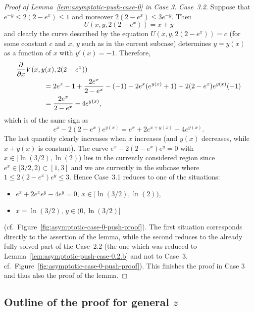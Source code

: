 \documentclass[a4paper]{amsart} %
\theoremstyle{definition}
\theoremstyle{remark}
\numberwithin{equation}{section}
\newcommand*{\XXXasymptoticDenominator}{V}
\newcommand*{\XXXasymptoticNominator}{U}
\begin{document}
\begin{proof}[Proof of Lemma~\ref{lem:asymptotic-push-case-0} in Case 3]
	\emph{Case~3.2}. Suppose that $e^{-y} \leq 2(2-e^x) \leq 1 $ and moreover $2(2-e^x) \leq 3e^{-y}$.
	Then
	\begin{equation*}
	\XXXasymptoticNominator(x,y,2(2-e^x)) = x + y
	\end{equation*}
	and clearly the curve described by the equation $\XXXasymptoticNominator(x,y,2(2-e^x)) = c$
	(for some constant $c$ and $x$, $y$ such as in the current subcase) determines $y=y(x)$ as a function of $x$ with $y'(x) = -1$.
	Therefore,
\begin{align*}
\MoveEqLeft[4]
\frac{\partial}{\partial x} \XXXasymptoticDenominator(x, y(x), 2(2-e^{x})) \\
&= 2e^{x} - 1  + \frac{2e^x}{2-e^x}
-(-1)
- 2e^{x} (e^{y(x)} + 1) + 2(2-e^{x}) e^{y(x)}(-1) \\
&=\frac{2e^x}{2-e^x} - 4e^{y(x)},
\end{align*}
which is of the same sign as 
\[
e^x - 2(2-e^x) e^{y(x)} = e^x + 2 e^{x + y(x)} - 4 e ^{y(x)}.
\]
The last quantity clearly increases when $x$ increases (and $y(x)$ decreases, while $x+y(x)$ is constant).
The curve $e^x - 2(2-e^x) e^{y} = 0$ with $x\in [\ln(3/2), \ln(2))$
lies in the currently considered region since 
$e^x \in [3/2, 2) \subset [1,3]$
and we are currently in the subcase where $1 \leq  2(2-e^x)e^y \leq 3$.
 Hence Case~3.1 reduces to one of the situations:
	 \begin{itemize}
	 	\item $e^x + 2 e^x e^{y} - 4 e ^{y} = 0$, $x\in [\ln(3/2), \ln(2))$,
	 	\item $x=\ln(3/2)$, $y\in (0,\ln(3/2)]$
	 \end{itemize}
	 (cf.\ Figure~\ref{fig:asymptotic-case-0-push-proof}).
	 The first situation corresponds directly to the assertion of the lemma,
	 while the second reduces to the already fully solved part of the Case~2.2
	 (the one which was reduced to Lemma~\ref{lem:asymptotic-push-case-0.2.b} and not to Case~3, cf.\ Figure~\ref{fig:asymptotic-case-0-push-proof}).
	 This finishes the proof in Case 3 and thus also the proof of the lemma.
\end{proof}	


	
	
\subsection{Outline of the proof for general \texorpdfstring{$z$}{z}}
\end{document}
